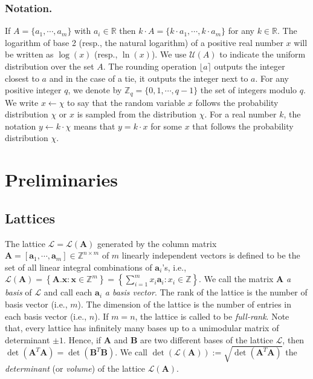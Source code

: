 \documentclass[runningheads]{llncs}
\begin{document}
\subsubsection{Notation.}If $A=\{a_1, \cdots ,a_m\}$ with $a_i\in \mathbb{R}$ then $k\cdot A=\{k\cdot  a_1,\cdots,k\cdot  a_m\}$ for any $k\in \mathbb{R}$. The logarithm of base 2 (resp., the natural logarithm) of a positive real number $x$ will be written as $\log (x)$ (resp., $\ln(x)$). We use $\mathcal{U}(A)$ to indicate the uniform distribution over the set $A$. The rounding operation $\lfloor a \rceil$ outputs the integer closest to $a$ and in the case of a tie, it outputs the integer next to $a$. For any positive integer $q$, we denote by $\mathbb{Z}_q=\{0,1, \cdots, q-1\}$ the set of integers modulo $q$. We write $x \leftarrow \chi$ to say that the random variable $x$ follows the probability distribution $\chi$ or $x$ is sampled from the distribution $\chi$. For a real number $k$, the notation $y \leftarrow k \cdot \chi$ means that $y=k \cdot x$ for some $x$ that follows the probability distribution $\chi$.


\section{Preliminaries}


\subsection{Lattices}

The lattice $\mathcal{L}=\mathcal{L}(\mathbf{A})$ generated by the column matrix $\mathbf{A}=[\mathbf{a}_1,\cdots,\mathbf{a}_{m} ] \in \mathbb{Z}^{n \times m}$ of $m$ linearly independent vectors is defined to be the set of all linear integral combinations of $\mathbf{a}_{i}$'s, i.e., 
	$\mathcal{L}(\mathbf{A})=\left\{ \mathbf{A}.\mathbf{x}: \mathbf{x} \in \mathbb{Z}^{m}\right\}=\left\{ \sum_{i=1}^{m} x_i\mathbf{a}_i: x_i \in \mathbb{Z}\right\}.  $
We call the matrix $\mathbf{A}$ \textit{a basis} of $\mathcal{L}$ and call each $\mathbf{a}_i$ \textit{a basis vector}. The rank of the lattice is the number of basis vector (i.e., $m$). The dimension of the lattice is the number of entries in each basis vector (i.e., $n$). If $m=n$, the lattice is called to be \textit{full-rank}. Note that, every lattice has infinitely many bases up to a unimodular matrix of determinant $\pm1$. Hence, if $\mathbf{A}$ and $\mathbf{B}$ are two different bases of the lattice $\mathcal{L}$, then $\det (\mathbf{A}^T \mathbf{A})=\det (\mathbf{B}^T \mathbf{B})$. We call $\det(\mathcal{L}(\mathbf{A})):=\sqrt{\det (\mathbf{A}^T \mathbf{A})}$ the \textit{determinant} (or \textit{volume}) of the lattice $\mathcal{L(\mathbf{A})}.$ 
\end{document}
